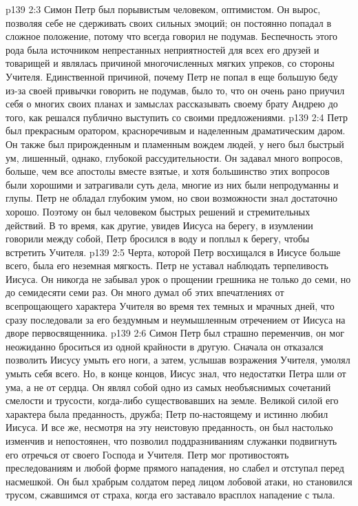 \vs p139 2:3 \pc Симон Петр был порывистым человеком, оптимистом. Он вырос, позволяя себе не сдерживать своих сильных эмоций; он постоянно попадал в сложное положение, потому что всегда говорил не подумав. Беспечность этого рода была источником непрестанных неприятностей для всех его друзей и товарищей и являлась причиной многочисленных мягких упреков, со стороны Учителя. Единственной причиной, почему Петр не попал в еще большую беду из\hyp{}за своей привычки говорить не подумав, было то, что он очень рано приучил себя о многих своих планах и замыслах рассказывать своему брату Андрею до того, как решался публично выступить со своими предложениями.
\vs p139 2:4 Петр был прекрасным оратором, красноречивым и наделенным драматическим даром. Он также был прирожденным и пламенным вождем людей, у него был быстрый ум, лишенный, однако, глубокой рассудительности. Он задавал много вопросов, больше, чем все апостолы вместе взятые, и хотя большинство этих вопросов были хорошими и затрагивали суть дела, многие из них были непродуманны и глупы. Петр не обладал глубоким умом, но свои возможности знал достаточно хорошо. Поэтому он был человеком быстрых решений и стремительных действий. В то время, как другие, увидев Иисуса на берегу, в изумлении говорили между собой, Петр бросился в воду и поплыл к берегу, чтобы встретить Учителя.
\vs p139 2:5 \pc Черта, которой Петр восхищался в Иисусе больше всего, была его неземная мягкость. Петр не уставал наблюдать терпеливость Иисуса. Он никогда не забывал урок о прощении грешника не только до семи, но до семидесяти семи раз. Он много думал об этих впечатлениях от всепрощающего характера Учителя во время тех темных и мрачных дней, что сразу последовали за его бездумным и неумышленным отречением от Иисуса на дворе первосвященника.
\vs p139 2:6 \pc Симон Петр был страшно переменчив, он мог неожиданно броситься из одной крайности в другую. Сначала он отказался позволить Иисусу умыть его ноги, а затем, услышав возражения Учителя, умолял умыть себя всего. Но, в конце концов, Иисус знал, что недостатки Петра шли от ума, а не от сердца. Он являл собой одно из самых необъяснимых сочетаний смелости и трусости, когда\hyp{}либо существовавших на земле. Великой силой его характера была преданность, дружба; Петр по\hyp{}настоящему и истинно любил Иисуса. И все же, несмотря на эту неистовую преданность, он был настолько изменчив и непостоянен, что позволил поддразниваниям служанки подвигнуть его отречься от своего Господа и Учителя. Петр мог противостоять преследованиям и любой форме прямого нападения, но слабел и отступал перед насмешкой. Он был храбрым солдатом перед лицом лобовой атаки, но становился трусом, сжавшимся от страха, когда его заставало врасплох нападение с тыла.
